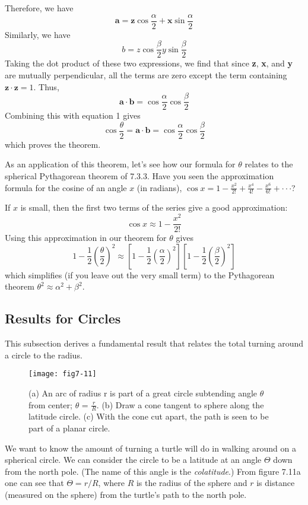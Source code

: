 \documentclass{book}
\begin{document}
Therefore, we have
$$ \mathbf{a} = \mathbf{z} \cos \frac {\alpha} {2} + \mathbf{x} \sin \frac {\alpha} {2} $$
 Similarly, we have
$$ b = z \cos \frac {\beta} {2} y \sin \frac {\beta} {2} $$
 Taking the dot product of these two expressions, we find that since \textbf{z},
\textbf{x}, and \textbf{y} are mutually perpendicular, all the terms are zero except the
term containing $\mathbf{z} \cdot \mathbf{z} = 1$. Thus,
$$ \mathbf{a} \cdot \mathbf{b} = \cos \frac {\alpha} {2} \cos \frac {\beta} {2} $$
 Combining this with equation 1 gives
$$ \cos \frac {\theta} {2} = \mathbf{a} \cdot \mathbf{b} = \cos \frac {\alpha} {2} \cos \frac {\beta} {2} $$
 which proves the theorem.

As an application of this theorem, let's see how our formula for $\theta$
relates to the spherical Pythagorean theorem of 7.3.3. Have you seen
the approximation formula for the cosine of an angle $x$ (in radians),
$ \cos x = 1 - \frac {x^2} {2!} + \frac {x^4} {4!} - \frac {x^6} {6!} + \cdot \cdot \cdot $?

If $x$ is small, then the first two terms of the series give a good approximation:
$$ \cos x \approx 1 - \frac {x^2} {2!} $$
 Using this approximation in our theorem for $\theta$ gives
$$ 1 - \frac{1}{2}(\frac{\theta}{2})^2 \approx [1 - \frac{1}{2}(\frac{\alpha}{2})^2][1 - \frac{1}{2}(\frac{\beta}{2})^2] $$
 which simplifies (if you leave out the very small term) to the
Pythagorean theorem $ \theta^2 \approx \alpha^2 + \beta^2 $.

\subsection{Results for Circles}

This subsection derives a fundamental result that relates the total turning around a circle to the radius.

\begin{figure}
\begin{center}
\texttt{[image: fig7-11]}
\caption{(a) An arc of radius r is part of a great circle subtending angle $\theta$ from center; $\theta$ = $\frac {r} {R}$. (b) Draw a cone tangent to sphere along the latitude circle. (c) With the cone cut apart, the path is seen to be part of a planar circle.}
\end{center}
\end{figure}

We want to know the amount of turning a turtle will do in walking
around on a spherical circle. We can consider the circle to be a latitude
at an angle $\Theta$ down from the north pole. (The name of this angle is the
{\em colatitude}.) From figure 7.11a one can see that $\Theta = r / R$, where $R$ is
the radius of the sphere and $r$ is distance (measured on the sphere) from
the turtle's path to the north pole.
\end{document}

